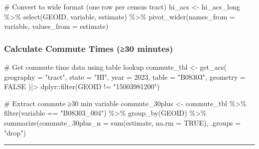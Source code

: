 \documentclass[
  letterpaper,
  DIV=11,
  numbers=noendperiod]{scrartcl}
\newenvironment{Shaded}{\begin{snugshade}}{\end{snugshade}}
\newcommand{\AttributeTok}[1]{\textcolor[rgb]{0.40,0.45,0.13}{#1}}
\newcommand{\CommentTok}[1]{\textcolor[rgb]{0.37,0.37,0.37}{#1}}
\newcommand{\ConstantTok}[1]{\textcolor[rgb]{0.56,0.35,0.01}{#1}}
\newcommand{\DecValTok}[1]{\textcolor[rgb]{0.68,0.00,0.00}{#1}}
\newcommand{\FunctionTok}[1]{\textcolor[rgb]{0.28,0.35,0.67}{#1}}
\newcommand{\NormalTok}[1]{\textcolor[rgb]{0.00,0.23,0.31}{#1}}
\newcommand{\OtherTok}[1]{\textcolor[rgb]{0.00,0.23,0.31}{#1}}
\newcommand{\SpecialCharTok}[1]{\textcolor[rgb]{0.37,0.37,0.37}{#1}}
\newcommand{\StringTok}[1]{\textcolor[rgb]{0.13,0.47,0.30}{#1}}
\begin{document}
\begin{Shaded}
\begin{Highlighting}[]
\CommentTok{\# Convert to wide format (one row per census tract)}
\NormalTok{hi\_acs }\OtherTok{\textless{}{-}}\NormalTok{ hi\_acs\_long }\SpecialCharTok{\%\textgreater{}\%}
  \FunctionTok{select}\NormalTok{(GEOID, variable, estimate) }\SpecialCharTok{\%\textgreater{}\%}
  \FunctionTok{pivot\_wider}\NormalTok{(}\AttributeTok{names\_from =}\NormalTok{ variable, }\AttributeTok{values\_from =}\NormalTok{ estimate)}
\end{Highlighting}
\end{Shaded}

\subsubsection{Calculate Commute Times (≥30
minutes)}\label{calculate-commute-times-30-minutes}

\begin{Shaded}
\begin{Highlighting}[]
\CommentTok{\# Get commute time data using table lookup}
\NormalTok{commute\_tbl }\OtherTok{\textless{}{-}} \FunctionTok{get\_acs}\NormalTok{(}
  \AttributeTok{geography =} \StringTok{"tract"}\NormalTok{,}
  \AttributeTok{state =} \StringTok{"HI"}\NormalTok{,}
  \AttributeTok{year =} \DecValTok{2023}\NormalTok{,}
  \AttributeTok{table =} \StringTok{"B08303"}\NormalTok{,}
  \AttributeTok{geometry =} \ConstantTok{FALSE}
\NormalTok{)}\SpecialCharTok{|\textgreater{}}
\NormalTok{  dplyr}\SpecialCharTok{::}\FunctionTok{filter}\NormalTok{(GEOID }\SpecialCharTok{!=} \StringTok{"15003981200"}\NormalTok{)}

\CommentTok{\# Extract commute ≥30 min variable}
\NormalTok{commute\_30plus }\OtherTok{\textless{}{-}}\NormalTok{ commute\_tbl }\SpecialCharTok{\%\textgreater{}\%}
  \FunctionTok{filter}\NormalTok{(variable }\SpecialCharTok{==} \StringTok{"B08303\_004"}\NormalTok{) }\SpecialCharTok{\%\textgreater{}\%}
  \FunctionTok{group\_by}\NormalTok{(GEOID) }\SpecialCharTok{\%\textgreater{}\%}
  \FunctionTok{summarize}\NormalTok{(}\AttributeTok{commute\_30plus\_n =} \FunctionTok{sum}\NormalTok{(estimate, }\AttributeTok{na.rm =} \ConstantTok{TRUE}\NormalTok{), }\AttributeTok{.groups =} \StringTok{"drop"}\NormalTok{)}
\end{Highlighting}
\end{Shaded}

\begin{center}\rule{0.5\linewidth}{0.5pt}\end{center}
\end{document}
